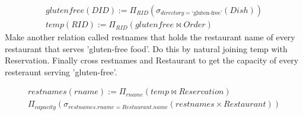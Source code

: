 \documentclass{article}
\begin{document}
\begin{enumerate}
		\begin{align}
        glutenfree(DID):= \Pi_{RID} (\sigma_{directory = \text{‘gluten-free’}}(Dish))\\
        temp(RID) := \Pi_{RID} (glutenfree \bowtie Order)
		\end{align} 
	Make another relation called restnames that holds the restaurant name of every restaurant that serves 'gluten-free food'. Do this by natural joining temp with Reservation. 
	Finally cross restnames and Restaurant to get the capacity of every resteraunt serving 'gluten-free'.
	
	\begin{align}
         restnames(rname):= \Pi_{rname} (temp \bowtie Reservation)\\
         \Pi_{capacity} (\sigma_{restnames.rname = Restaurant.name} (restnames \times Restaurant))
		\end{align} 
	
	
\end{enumerate}
\end{document}
